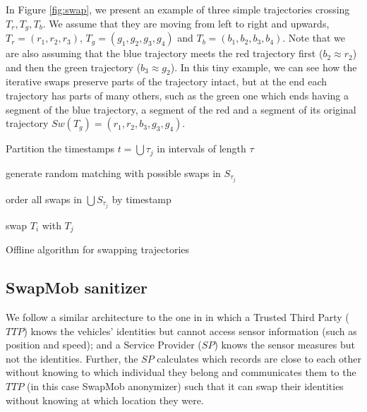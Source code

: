 \documentclass{llncs}
\begin{document}
In Figure \ref{fig:swap}, we present an example of three simple trajectories crossing $T_r, T_g, T_b$. We assume that they are moving from left to right and upwards, $T_r = (r_1, r_2, r_3)$, $T_g = (g_1, g_2, g_3, g_4)$ and $T_b = (b_1, b_2, b_3, b_4)$. Note that we are also assuming that the blue trajectory meets the red trajectory first ($b_2 \approx r_2$) and then the green trajectory ($b_3 \approx g_2$). In this tiny example, we can see how the iterative swaps preserve parts of the trajectory intact, but at the end each trajectory has parts of many others, such as the green one which ends having a segment of the blue trajectory, a segment of the red and a segment of its original trajectory $Sw(T_g)=(r_1, r_2, b_3, g_3, g_4)$.


\begin{algorithm}[t]
\SetAlgoNoLine
{}

Partition the timestamps $t =\bigcup \tau_j$ in intervals of length $\tau$

generate random matching with possible swaps in $S_{\tau_j}$\

order all swaps in $\bigcup S_{\tau_j}$ by timestamp\

{swap $T_i$ with $T_j$}

\caption{Offline algorithm for swapping trajectories}
\label{alg:one}
\end{algorithm}


\subsection{SwapMob sanitizer}

We follow a similar architecture to the one in \cite{Hoh06} in which a Trusted Third Party ($TTP$) knows the
vehicles' identities but cannot access sensor information (such as position and  speed); and a Service Provider ($SP$) knows the sensor measures but not the identities.
Further, the $SP$ calculates which records are close to each other without knowing to which individual they belong and communicates them to the $TTP$ (in this case SwapMob anonymizer) such that it can swap their identities without knowing at which location they were.
\end{document}

